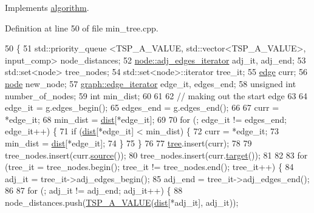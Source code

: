 Implements \mbox{\hyperlink{classalgorithm_a734b189509a8d6b56b65f8ff772d43ca}{algorithm}}.



Definition at line 50 of file min\+\_\+tree.\+cpp.


\begin{DoxyCode}
50                            \{ 
51     std::priority\_queue <TSP\_A\_VALUE, std::vector<TSP\_A\_VALUE>, input\_comp> node\_distances;
52     \mbox{\hyperlink{classnode_a12cb1a2167f5f03c054de5e707d3156f}{node::adj\_edges\_iterator}} adj\_it, adj\_end;
53     std::set<node> tree\_nodes;
54     std::set<node>::iterator tree\_it;
55     \mbox{\hyperlink{classedge}{edge}} curr;
56     \mbox{\hyperlink{classnode}{node}} new\_node;
57     \mbox{\hyperlink{classgraph_a818d3766018eb0af91d520ce2150203c}{graph::edge\_iterator}} edge\_it, edges\_end;
58     \textcolor{keywordtype}{unsigned} \textcolor{keywordtype}{int} number\_of\_nodes;
59     \textcolor{keywordtype}{int} min\_dist;
60 
61 
62     \textcolor{comment}{// making out the start edge}
63 
64     edge\_it = \mbox{\hyperlink{rings_8cpp_aa9df5aa3976a89a96a5f1c7611d42938}{g}}.edges\_begin();
65     edges\_end = \mbox{\hyperlink{rings_8cpp_aa9df5aa3976a89a96a5f1c7611d42938}{g}}.edges\_end();
66 
67     curr = *edge\_it;
68     min\_dist = \mbox{\hyperlink{classmin__tree_ae612767aa8e3eb3bedd1dadd7c68f99c}{dist}}[*edge\_it];
69 
70     \textcolor{keywordflow}{for} (; edge\_it != edges\_end; edge\_it++) \{ 
71     \textcolor{keywordflow}{if} (\mbox{\hyperlink{classmin__tree_ae612767aa8e3eb3bedd1dadd7c68f99c}{dist}}[*edge\_it] < min\_dist) \{ 
72         curr = *edge\_it;
73         min\_dist = \mbox{\hyperlink{classmin__tree_ae612767aa8e3eb3bedd1dadd7c68f99c}{dist}}[*edge\_it];
74     \}
75     \}
76 
77     \mbox{\hyperlink{classmin__tree_a138e9248f851ee2562df6644626a1f0b}{tree}}.insert(curr);
78  
79     tree\_nodes.insert(curr.\mbox{\hyperlink{classedge_ae82d5701f7e6f71edc3c8b0e34bcd2b7}{source}}());
80     tree\_nodes.insert(curr.\mbox{\hyperlink{classedge_a97563b611261478ee19c6ce055f1a3ee}{target}}());
81 
82 
83     \textcolor{keywordflow}{for} (tree\_it = tree\_nodes.begin(); tree\_it != tree\_nodes.end(); tree\_it++) \{ 
84     adj\_it = tree\_it->adj\_edges\_begin();
85     adj\_end = tree\_it->adj\_edges\_end();
86 
87     \textcolor{keywordflow}{for} (; adj\_it != adj\_end; adj\_it++) \{  
88         node\_distances.push(\mbox{\hyperlink{classmin__tree_af83e196caf3ebcdc9035dc42aee581ee}{TSP\_A\_VALUE}}(\mbox{\hyperlink{classmin__tree_ae612767aa8e3eb3bedd1dadd7c68f99c}{dist}}[*adj\_it], adj\_it));

\end{DoxyCode}
